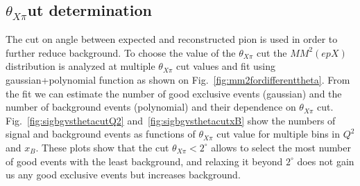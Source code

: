 \subsection{\texorpdfstring{$\theta_{X\pi}$} cut determination}

The cut on angle between expected and reconstructed pion is used in order to further reduce background.
To choose the value of the $\theta_{X\pi}$ cut the $MM^2(epX)$ distribution is analyzed at multiple $\theta_{X\pi}$ cut values and fit using gaussian+polynomial function as shown on Fig.~\ref{fig:mm2fordifferenttheta}.
From the fit we can estimate the number of good exclusive events (gaussian) and the number of background events (polynomial) and their dependence on $\theta_{X\pi}$ cut.
Fig.~\ref{fig:sigbgvsthetacutQ2} and~\ref{fig:sigbgvsthetacutxB} show the numbers of signal and background events as functions of $\theta_{X\pi}$ cut value for multiple bins in $Q^2$ and $x_B$.
These plots show that the cut $\theta_{X\pi}<2^\circ$ allows to select the most number of good events with the least background, and relaxing it beyond $2^\circ$ does not gain us any good exclusive events but increases background.


